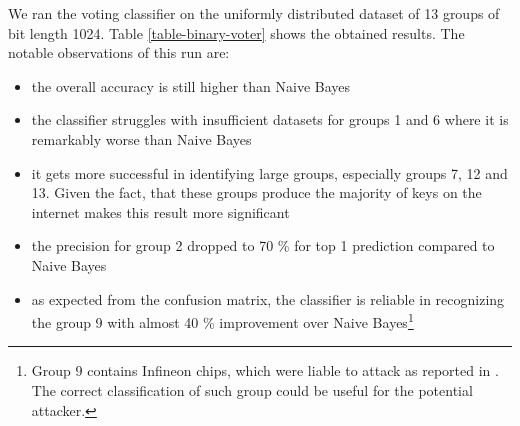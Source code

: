 We ran the voting classifier on the uniformly distributed dataset of 13 groups of bit length 1024. Table \ref{table-binary-voter} shows the obtained results. The notable observations of this run are:

\begin{itemize}

\item the overall accuracy is still higher than Naive Bayes

\item the classifier struggles with insufficient datasets for groups 1 and 6 where it is remarkably worse than Naive Bayes

\item it gets more successful in identifying large groups, especially groups 7, 12 and 13. Given the fact, that these groups produce the majority of keys on the internet makes this result more significant

\item the precision for group 2 dropped to 70 \% for top 1 prediction compared to Naive Bayes

\item as expected from the confusion matrix, the classifier is reliable in recognizing the group 9 with almost 40 \% improvement over Naive Bayes\footnote{Group 9 contains Infineon chips, which were liable to attack as reported in \cite{svenda_2}. The correct classification of such group could be useful for the potential attacker.}

\end{itemize}

